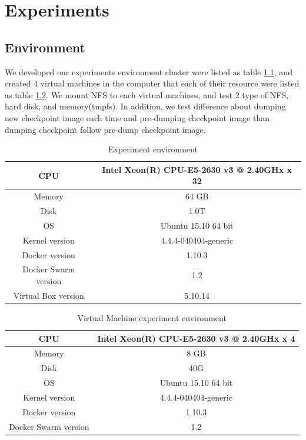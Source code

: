 \chapter{Experiments}
\label{chap:experiments}
\section{Environment}
We developed our experiments environment cluster were listed as table \ref{talbe:Host}, and created 4 virtual machines in the computer that each of their resource were listed as table \ref{talbe:Virtual Machine}. We mount NFS to each virtual machines, and test 2 type of NFS, hard disk, and memory(tmpfs). In addition, we test difference about dumping new checkpoint image each time and pre-dumping checkpoint image than dumping checkpoint follow pre-dump checkpoint image.

\begin{table}[hbtp]
\begin{center}
\begin{tabular}{|c|c|} \hline
CPU & Intel Xeon(R) CPU-E5-2630 v3 @ 2.40GHx x 32 \\ \hline
Memory & 64 GB \\ \hline
Disk & 1.0T \\ \hline
OS & Ubuntu 15.10 64 bit \\ \hline
Kernel version & 4.4.4-040404-generic \\ \hline
Docker version & 1.10.3 \\ \hline
Docker Swarm version & 1.2 \\ \hline
Virtual Box version & 5.10.14 \\ \hline
\end{tabular}
\end{center}
\caption{Experiment environment}
\label{talbe:Host}
\end{table}

\begin{table}[hbtp]
\begin{center}
\begin{tabular}{|c|c|} \hline
CPU & Intel Xeon(R) CPU-E5-2630 v3 @ 2.40GHx x 4 \\ \hline
Memory & 8 GB \\ \hline
Disk & 40G \\ \hline
OS & Ubuntu 15.10 64 bit \\ \hline
Kernel version & 4.4.4-040404-generic \\ \hline
Docker version & 1.10.3 \\ \hline
Docker Swarm version & 1.2 \\ \hline
\end{tabular}
\end{center}
\caption{Virtual Machine experiment environment}
\label{talbe:Virtual Machine}
\end{table}

